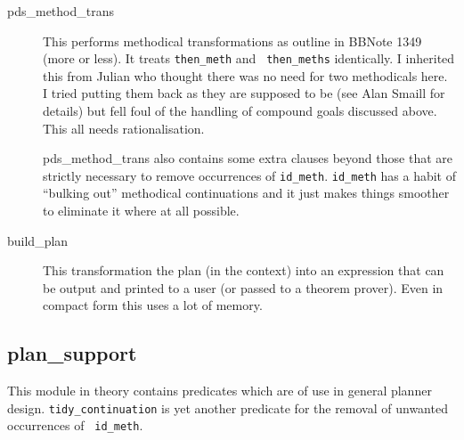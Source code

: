 \begin{description}
\item[pds\_method\_trans] This performs
    methodical transformations as outline in BBNote 1349 (more or
    less).  It treats {\tt then\_meth} and {\tt
      then\_meths} identically.  I inherited this
    from Julian who thought there was no need for two
    methodicals here.  I tried putting them back as
    they are supposed to be (see Alan Smaill for details) but fell
    foul of the handling of compound goals
    discussed above.  This all needs rationalisation.

pds\_method\_trans also contains some extra
clauses beyond those that are strictly necessary to remove occurrences
of {\tt id\_meth}.  {\tt id\_meth} has a habit of
``bulking out'' methodical continuations and it just makes things
smoother to eliminate it where at all possible.

\item[build\_plan] This transformation the plan
    (in the context) into an expression that can be output and printed 
    to a user (or passed to a theorem prover).  Even in compact form
    this uses a lot of memory.
\end{description}

\subsection{plan\_support}
This module in theory contains predicates which are of use in general
planner design.  {\tt tidy\_continuation} is
yet another predicate for the removal of unwanted occurrences of {\tt
  id\_meth}.

